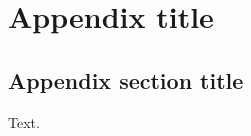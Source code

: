 \section{Appendix title}\label{app:label}

\begingroup
{}
{\leftskip 0pt}
{\leftskip 0pt}
{\bfseries\footnotesize\makebox[1cm][l]{\etocnumber}%
	\etocname\nobreak\hfill\nobreak\etocpage
	\par
}
{}
{}
{\leftskip 30pt}
{\mdseries\footnotesize\makebox[1cm][l]{\etocnumber}%
	\etocname\nobreak\hfill\nobreak\etocpage
	\par
}
{}
\endgroup

\subsection{Appendix section title}
\label{app:label}

Text.

